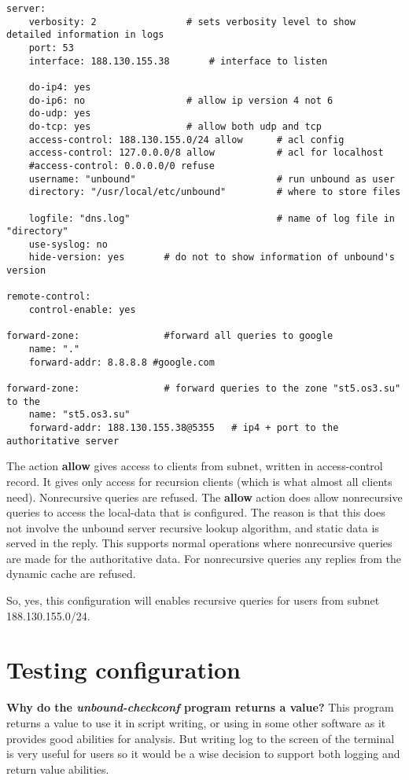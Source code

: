 \documentclass[a4paper]{article}
\newcommand\tab[1][1cm]{\hspace*{#1}}
\begin{document}
 \begin{verbatim}
server:
	verbosity: 2				# sets verbosity level to show detailed information in logs
	port: 53
	interface: 188.130.155.38		# interface to listen
	
	do-ip4: yes
	do-ip6: no                  # allow ip version 4 not 6
	do-udp: yes
	do-tcp: yes                 # allow both udp and tcp
	access-control: 188.130.155.0/24 allow      # acl config	
	access-control: 127.0.0.0/8 allow           # acl for localhost
	#access-control: 0.0.0.0/0 refuse       
	username: "unbound"                         # run unbound as user
	directory: "/usr/local/etc/unbound"         # where to store files

	logfile: "dns.log"                          # name of log file in "directory"
	use-syslog: no
	hide-version: yes		# do not to show information of unbound's version

remote-control:
	control-enable: yes

forward-zone:				#forward all queries to google
	name: "."
 	forward-addr: 8.8.8.8 #google.com

forward-zone:				# forward queries to the zone "st5.os3.su" to the
	name: "st5.os3.su"
 	forward-addr: 188.130.155.38@5355   # ip4 + port to the authoritative server

\end{verbatim}

The action \textbf{allow} gives access to clients from subnet, written in access-control record. It gives only access for recursion clients (which is what almost all clients need).  Nonrecursive queries are refused.  \newline 
The \textbf{allow} action does allow nonrecursive queries to access the local-data that is configured. The reason is that this does not involve the unbound server recursive lookup  algorithm, and static data is served in the reply. This supports normal operations where nonrecursive queries are made for the authoritative data. For nonrecursive queries any replies from the dynamic cache are refused.

So, yes, this configuration will enables recursive queries for users from subnet 188.130.155.0/24. 



\section{Testing configuration}
\tab \textbf{Why do the \textit{unbound-checkconf} program returns a value?} \newline
\tab This program returns a value to use it in script writing, or using in some other software as it provides good abilities for analysis. \newline 
\tab But writing log to the screen of the terminal is very useful for users so it would be a wise decision to support both logging and return value abilities.  
\end{document}
